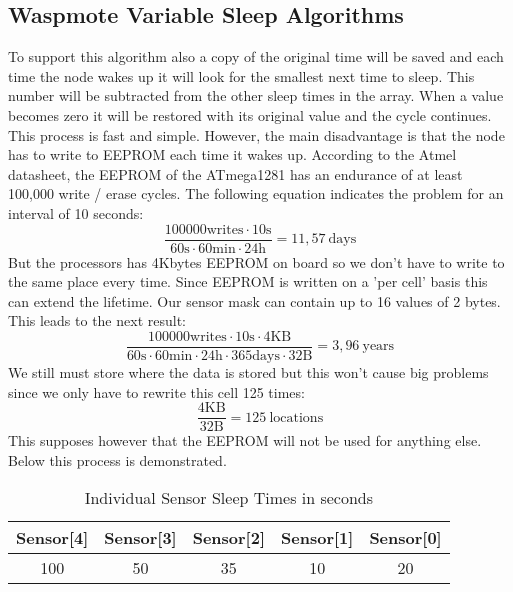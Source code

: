 \subsection{Waspmote Variable Sleep Algorithms}
\label{AppendixC} %
To support this algorithm also a copy of the original time will be saved and each time the node wakes up it will look for the smallest next time to sleep. This number will be subtracted from the other sleep times in the array. When a value becomes zero it will be restored with its original value and the cycle continues.\\  
This process is fast and simple. However, the main disadvantage is that the node has to write to EEPROM each time it wakes up. According to the Atmel datasheet, the EEPROM of the ATmega1281 has an endurance of at least 100,000 write / erase cycles. The following equation indicates the problem for an interval of 10 seconds:
\begin{equation}
\frac{100000 \mathrm{writes} \cdot 10 \mathrm{s}}{60 \mathrm{s} \cdot 60 \mathrm{min} \cdot 24 \mathrm{h}}= 11,57 \: \mathrm{days} 
\label{eq:1}
\end{equation}
But the processors has 4Kbytes EEPROM on board so we don't have to write to the same place every time. Since EEPROM is written on a 'per cell' basis this can extend the lifetime. Our sensor mask can contain up to 16 values of 2 bytes. This leads to the next result:
\begin{equation}
\frac{100000 \mathrm{writes} \cdot 10 \mathrm{s} \cdot 4\mathrm{KB}}{60 \mathrm{s} \cdot 60 \mathrm{min} \cdot 24 \mathrm{h} \cdot 365\mathrm{days} \cdot 32\mathrm{B}} = 3,96\: \mathrm{years}
\end{equation}
We still must store where the data is stored but this won't cause big problems since we only have to rewrite this cell 125 times:
\begin{equation}
\frac{4\mathrm{KB}}{32\mathrm{B}} = 125 \: \mathrm{locations}
\end{equation}
This supposes however that the EEPROM will not be used for anything else. Below this process is demonstrated.\\
\begin{table}[!hb]
\begin{center}
\begin{tabular}[!hb]{|c|c|c|c|c|}
\hline
\textbf{Sensor[4]} & \textbf{Sensor[3]} & \textbf{Sensor[2]} & \textbf{Sensor[1]} &\textbf{Sensor[0]}\\
\hline
100  & 50 & 35 & 10 & 20\\
\hline
\end{tabular}
\caption{Individual Sensor Sleep Times in seconds}
\label{tab:sleep1}
\end{center}
\end{table}
